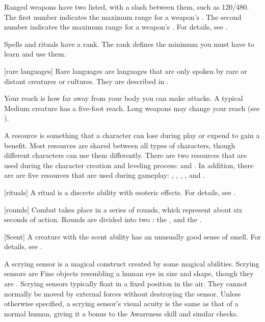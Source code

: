  Ranged weapons have two  listed, with a slash between them, such as 120/480.
The first number indicates the maximum range for a weapon's .
The second number indicates the maximum range for a weapon's .
For details, see .

 Spells and rituals have a rank.
The rank defines the minimum  you must have to learn and use them.

[rare languages] Rare languages are languages that are only spoken by rare or distant creatures or cultures.
They are described in .

 Your reach is how far away from your body you can make  attacks.
A typical Medium creature has a five-foot reach.
Long weapons may change your reach (see ).

 A resource is something that a character can lose during play or expend to gain a benefit.
Most resources are shared between all types of characters, though different characters can use them differently.
There are two resources that are used during the character creation and leveling process:  and .
In addition, there are are five resources that are used during gameplay: , , , , and .

[rituals] A ritual is a discrete  ability with esoteric effects.
For details, see .

[rounds] Combat takes place in a series of rounds, which represent about six seconds of action.
Rounds are divided into two : the , and the .

[Scent] A creature with the scent ability has an unusually good sense of smell.
For details, see .

 A scrying sensor is a magical construct created by some magical abilities.
Scrying sensors are Fine objects resembling a human eye in size and shape, though they are .
Scrying sensors typically float in a fixed position in the air.
They cannot normally be moved by external forces without destroying the sensor.
Unless otherwise specified, a scrying sensor's visual acuity is the same as that of a normal human, giving it a  bonus to the Awareness skill and similar checks.

